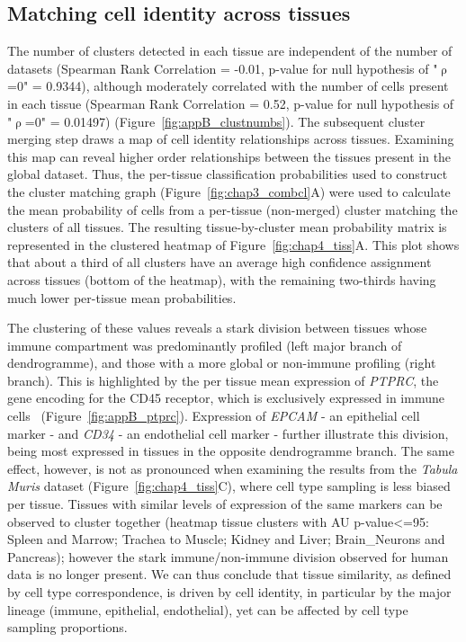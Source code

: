 \subsection{Matching cell identity across tissues}
\label{section_tissues}
The number of clusters detected in each tissue are independent of the number of datasets (Spearman Rank Correlation = -0.01, p-value for null hypothesis of "${\uprho}$=0" = 0.9344), although moderately correlated with the number of cells present in each tissue (Spearman Rank Correlation = 0.52, p-value for null hypothesis of "${\uprho}$=0" = 0.01497) (Figure~\ref{fig:appB_clustnumbs}). The subsequent cluster merging step draws a map of cell identity relationships across tissues. Examining this map can reveal higher order relationships between the tissues present in the global dataset. Thus, the per-tissue classification probabilities used to construct the cluster matching graph (Figure~\ref{fig:chap3_combcl}A) were used to calculate the mean probability of cells from a per-tissue (non-merged) cluster matching the clusters of all tissues. The resulting tissue-by-cluster mean probability matrix is represented in the clustered heatmap of Figure~\ref{fig:chap4_tiss}A. This plot shows that about a third of all clusters have an average high confidence assignment across tissues (bottom of the heatmap), with the remaining two-thirds having much lower per-tissue mean probabilities. 

The clustering of these values reveals a stark division between tissues whose immune compartment was predominantly profiled (left major branch of dendrogramme), and those with a more global or non-immune profiling (right branch). This is highlighted by the per tissue mean expression of \textit{PTPRC}, the gene encoding for the CD45 receptor, which is exclusively expressed in immune cells~\citep{altin_role_1997} (Figure~\ref{fig:appB_ptprc}). Expression of \textit{EPCAM} - an epithelial cell marker - and \textit{CD34} - an endothelial cell marker - further illustrate this division, being most expressed in tissues in the opposite dendrogramme branch. The same effect, however, is not as pronounced when examining the results from the \textit{Tabula Muris} dataset (Figure~\ref{fig:chap4_tiss}C), where cell type sampling is less biased per tissue. Tissues with similar levels of expression of the same markers can be observed to cluster together (heatmap tissue clusters with AU p-value<=95: Spleen and Marrow; Trachea to Muscle; Kidney and Liver; Brain\_Neurons and Pancreas); however the stark immune/non-immune division observed for human data is no longer present. We can thus conclude that tissue similarity, as defined by cell type correspondence, is driven by cell identity, in particular by the major lineage (immune, epithelial, endothelial), yet can be affected by cell type sampling proportions.

